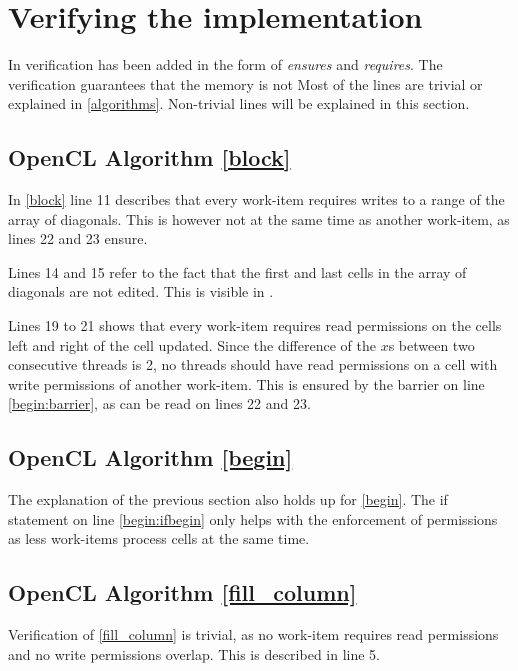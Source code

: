 \section{Verifying the implementation} \label{q3}
In  verification has been added in the form of \textit{ensures} and \textit{requires}.
The verification guarantees that the memory is not
Most of the lines are trivial or explained in \cref{algorithms}.
Non-trivial lines will be explained in this section. 

\subsection{OpenCL Algorithm \ref*{block}} \label{ver:block}
In \cref{block} line 11 describes that every work-item requires writes to a range of the array of diagonals.
This is however not at the same time as another work-item, as lines 22 and 23 ensure. 

Lines 14 and 15 refer to the fact that the first and last cells in the array of diagonals are not edited.
This is visible in .

Lines 19 to 21 shows that every work-item requires read permissions on the cells left and right of the cell updated.
Since the difference of the $x$s between two consecutive threads is 2, no threads should have read permissions on a cell with write permissions of another work-item.
This is ensured by the barrier on line \ref{begin:barrier}, as can be read on lines 22 and 23.

\subsection{OpenCL Algorithm \ref*{begin}} \label{ver:begin}
The explanation of the previous section also holds up for \cref{begin}.
The if statement on line \ref{begin:ifbegin} only helps with the enforcement of permissions as less work-items process cells at the same time.

\subsection{OpenCL Algorithm \ref*{fill_column}} \label{ver:fill_column}
Verification of \cref{fill_column} is trivial, as no work-item requires read permissions and no write permissions overlap.
This is described in line 5.



